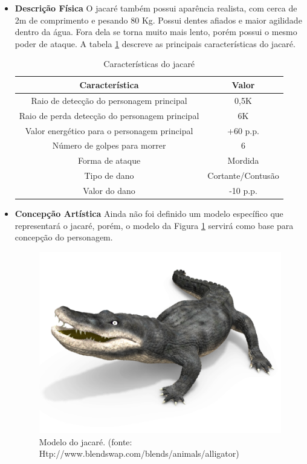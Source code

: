 \begin{itemize}
\item {\bf Descrição Física}
O jacaré também possui aparência realista, com cerca de 2m de comprimento e
 pesando 80 Kg. Possui dentes afiados e maior agilidade dentro da água.
 Fora dela se torna muito mais lento, porém possui o mesmo poder de ataque.
 A tabela \ref{table:jacare} descreve as principais características do jacaré.

\begin{table}[H]
\begin{center}
\begin{tabular}{|c|c|}
\hline 
\textbf{Característica} & \textbf{Valor} \\ 
\hline 
Raio de detecção do personagem principal & 0,5K \\ 
\hline 
Raio de perda detecção do personagem principal & 6K \\ 
\hline 
Valor energético para o personagem principal & +60 p.p. \\ 
\hline 
Número de golpes para morrer & 6 \\ 
\hline 
Forma de ataque & Mordida \\ 
\hline 
Tipo de dano & Cortante/Contusão \\ 
\hline 
Valor do dano & -10 p.p. \\ 
\hline 
\end{tabular} 
\caption{Características do jacaré}
\label{table:jacare}
\end{center}
\end{table}

\item {\bf Concepção Artística}
Ainda não foi definido um modelo específico que representará o jacaré,
 porém, o modelo da Figura \ref{img:jacare} servirá como base para concepção do
 personagem.
\newpage
\begin{figure}[H]
 \centering
 \includegraphics[scale=1]{Imagens/jacare01.png}
 \caption{Modelo do jacaré. (fonte: Htp://www.blendswap.com/blends/animals/alligator)}
\label{img:jacare}
\end{figure}


\end{itemize}
